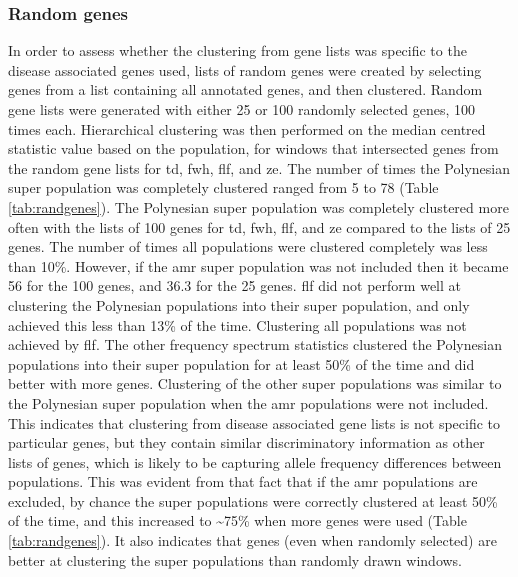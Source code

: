 \documentclass[]{report}
\begin{document}
\subsubsection{Random genes}\label{randomgenes}

In order to assess whether the clustering from gene lists was specific
to the disease associated genes used, lists of random genes were created
by selecting genes from a list containing all annotated genes, and then
clustered. Random gene lists were generated with either 25 or 100
randomly selected genes, 100 times each. Hierarchical clustering was
then performed on the median centred statistic value based on the
population, for windows that intersected genes from the random gene
lists for \gls{td}, \gls{fwh}, \gls{flf}, and \gls{ze}. The number of
times the Polynesian super population was completely clustered ranged
from 5 to 78 (Table \ref{tab:randgenes}). The Polynesian super
population was completely clustered more often with the lists of 100
genes for \gls{td}, \gls{fwh}, \gls{flf}, and \gls{ze} compared to the
lists of 25 genes. The number of times all populations were clustered
completely was less than 10\%. However, if the \gls{amr} super
population was not included then it became 56 for the 100 genes, and
36.3 for the 25 genes. \gls{flf} did not perform well at clustering the
Polynesian populations into their super population, and only achieved
this less than 13\% of the time. Clustering all populations was not
achieved by \gls{flf}. The other frequency spectrum statistics clustered
the Polynesian populations into their super population for at least 50\%
of the time and did better with more genes. Clustering of the other
super populations was similar to the Polynesian super population when
the \gls{amr} populations were not included. This indicates that
clustering from disease associated gene lists is not specific to
particular genes, but they contain similar discriminatory information as
other lists of genes, which is likely to be capturing allele frequency
differences between populations. This was evident from that fact that if
the \gls{amr} populations are excluded, by chance the super populations
were correctly clustered at least 50\% of the time, and this increased
to \textasciitilde{}75\% when more genes were used (Table
\ref{tab:randgenes}). It also indicates that genes (even when randomly
selected) are better at clustering the super populations than randomly
drawn windows.
\end{document}
